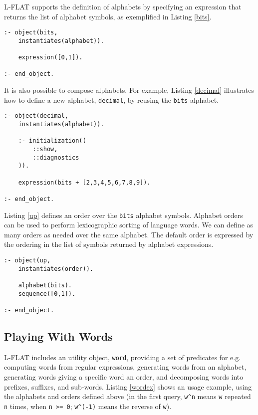 \documentclass{llncs}
\begin{document}
L-FLAT supports the definition of alphabets by specifying an expression that returns the list of alphabet symbols, as exemplified in Listing \ref{bits}.

\begin{lstlisting}[caption={A simple alphabet, \lstinline{bits}, for a binary language}, label=bits]
:- object(bits,
	instantiates(alphabet)).

	expression([0,1]).

:- end_object.
\end{lstlisting}

\noindent
It is also possible to compose alphabets. For example, Listing \ref{decimal} illustrates how to define a new alphabet, \lstinline{decimal}, by reusing the \lstinline{bits} alphabet.

\begin{lstlisting}[caption={Defining a new alphabet, \lstinline{decimal}, by reusing another alphabet}, label=decimal]
:- object(decimal,
	instantiates(alphabet)).

	:- initialization((
		::show,
		::diagnostics
	)).

	expression(bits + [2,3,4,5,6,7,8,9]).

:- end_object.
\end{lstlisting}

\noindent
Listing \ref{up} defines an order over the \lstinline{bits} alphabet symbols. Alphabet orders can be used to perform lexicographic sorting of language words. We can define as many orders as needed over the same alphabet. The default order is expressed by the ordering in the list of symbols returned by alphabet expressions.

\begin{lstlisting}[caption={Defining an order over the symbols of alphabet \lstinline{bits}}, label=up]
:- object(up,
	instantiates(order)).

	alphabet(bits).
	sequence([0,1]).

:- end_object.
\end{lstlisting}

\noindent


\subsection{Playing With Words}

L-FLAT includes an utility object, \lstinline{word}, providing a set of predicates for e.g. computing words from regular expressions, generating words from an alphabet, generating words giving a specific word an order, and decomposing words into prefixes, suffixes, and sub-words. Listing \ref{wordex} shows an usage example, using the alphabets and orders defined above (in the first query, \lstinline{w^n} means \lstinline{w} repeated \lstinline{n} times, when \lstinline{n >= 0}; \lstinline{w^(-1)} means the reverse of \lstinline{w}).
\end{document}
